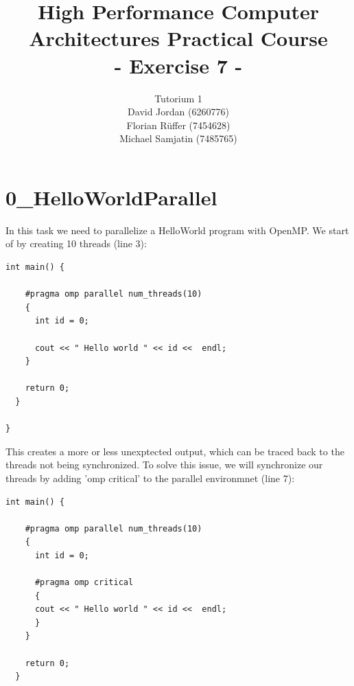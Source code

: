 \documentclass{article}
\title{\textbf{High Performance Computer Architectures Practical Course \\ - Exercise 7 -} \\[10mm]}
\author{Tutorium 1 \\[10mm] David Jordan (6260776) \\[1mm] Florian Rüffer (7454628) \\[1mm] Michael Samjatin (7485765) \\[10mm]}
\begin{document}
\maketitle
\newpage
\section*{0\_HelloWorldParallel}
In this task we need to parallelize a HelloWorld program with OpenMP.
We start of by creating 10 threads (line 3):

\begin{lstlisting}[caption=Step 1]
    int main() {

    #pragma omp parallel num_threads(10)
    {
      int id = 0;
      
      cout << " Hello world " << id <<  endl;
    }
  
    return 0;
  }
  
}
\end{lstlisting}
This creates a more or less unexptected output, which can be traced back to the threads not being synchronized.
To solve this issue, we will synchronize our threads by adding 'omp critical' to the parallel environmnet (line 7):

\begin{lstlisting}[caption=Step 2]
    int main() {

    #pragma omp parallel num_threads(10)
    {
      int id = 0;
      
      #pragma omp critical
      {
      cout << " Hello world " << id <<  endl;
      }
    }
  
    return 0;
  }
  
\end{lstlisting}
\end{document}

